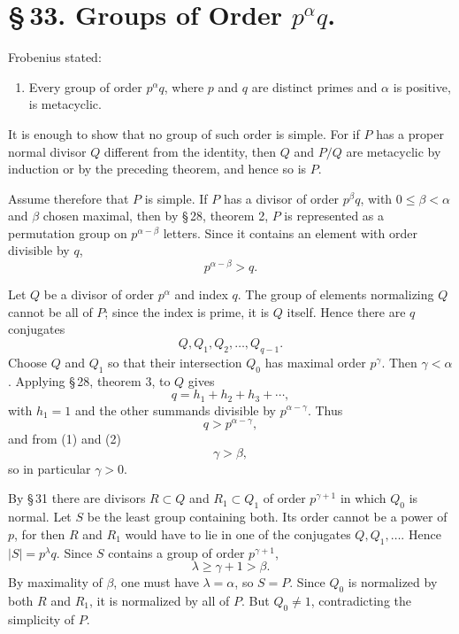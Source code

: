 \documentclass[11pt]{article}
\begin{document}
\section*{\S\,33. Groups of Order $p^\alpha q$.}

Frobenius stated:
\begin{enumerate}[label=\Roman*.,leftmargin=2.4em,start=6]
\item Every group of order $p^\alpha q$, where $p$ and $q$ are distinct primes and $\alpha$ is positive, is metacyclic.
\end{enumerate}
It is enough to show that no group of such order is simple. For if $P$ has a proper normal divisor $Q$ different from the identity, then $Q$ and $P/Q$ are metacyclic by induction or by the preceding theorem, and hence so is $P$.

Assume therefore that $P$ is simple. If $P$ has a divisor of order $p^\beta q$, with $0\le\beta<\alpha$ and $\beta$ chosen maximal, then by \S\,28, theorem 2, $P$ is represented as a permutation group on $p^{\alpha-\beta}$ letters. Since it contains an element with order divisible by $q$,
\begin{equation}
p^{\alpha-\beta}>q.
\tag{1}
\end{equation}

Let $Q$ be a divisor of order $p^\alpha$ and index $q$. The group of elements normalizing $Q$ cannot be all of $P$; since the index is prime, it is $Q$ itself. Hence there are $q$ conjugates
\[
Q,Q_1,Q_2,\ldots,Q_{q-1}.
\]
Choose $Q$ and $Q_1$ so that their intersection $Q_0$ has maximal order $p^\gamma$. Then $\gamma<\alpha$. Applying \S\,28, theorem 3, to $Q$ gives
\[
q=h_1+h_2+h_3+
\cdots,
\]
with $h_1=1$ and the other summands divisible by $p^{\alpha-\gamma}$. Thus
\begin{equation}
q>p^{\alpha-\gamma},
\tag{2}
\end{equation}
and from (1) and (2)
\begin{equation}
\gamma>\beta,
\tag{3}
\end{equation}
so in particular $\gamma>0$.

By \S\,31 there are divisors $R\subset Q$ and $R_1\subset Q_1$ of order $p^{\gamma+1}$ in which $Q_0$ is normal. Let $S$ be the least group containing both. Its order cannot be a power of $p$, for then $R$ and $R_1$ would have to lie in one of the conjugates $Q,Q_1,\ldots$. Hence $|S|=p^\lambda q$. Since $S$ contains a group of order $p^{\gamma+1}$,
\[
\lambda\ge\gamma+1>\beta.
\]
By maximality of $\beta$, one must have $\lambda=\alpha$, so $S=P$. Since $Q_0$ is normalized by both $R$ and $R_1$, it is normalized by all of $P$. But $Q_0\ne1$, contradicting the simplicity of $P$.
\end{document}
